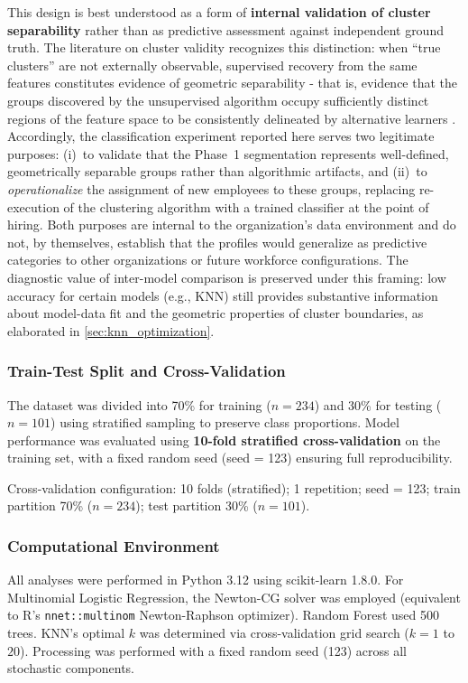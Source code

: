 \documentclass[alpha-refs,english]{RBCA_v3.0}
\begin{document}
This design is best understood as a form of \textbf{internal validation of cluster separability} rather than as predictive assessment against independent ground truth. The literature on cluster validity recognizes this distinction: when ``true clusters'' are not externally observable, supervised recovery from the same features constitutes evidence of geometric separability - that is, evidence that the groups discovered by the unsupervised algorithm occupy sufficiently distinct regions of the feature space to be consistently delineated by alternative learners \citep{Hennig2015}. Accordingly, the classification experiment reported here serves two legitimate purposes: (i)~to validate that the Phase~1 segmentation represents well-defined, geometrically separable groups rather than algorithmic artifacts, and (ii)~to \emph{operationalize} the assignment of new employees to these groups, replacing re-execution of the clustering algorithm with a trained classifier at the point of hiring. Both purposes are internal to the organization's data environment and do not, by themselves, establish that the profiles would generalize as predictive categories to other organizations or future workforce configurations. The diagnostic value of inter-model comparison is preserved under this framing: low accuracy for certain models (e.g., KNN) still provides substantive information about model-data fit and the geometric properties of cluster boundaries, as elaborated in \cref{sec:knn_optimization}.

\subsubsection{Train-Test Split and Cross-Validation}
The dataset was divided into 70\% for training ($n=234$) and 30\% for testing ($n=101$) using stratified sampling to preserve class proportions. Model performance was evaluated using \textbf{10-fold stratified cross-validation} on the training set, with a fixed random seed (seed = 123) ensuring full reproducibility.

Cross-validation configuration: 10 folds (stratified); 1 repetition; seed = 123; train partition 70\% ($n=234$); test partition 30\% ($n=101$).

\subsubsection{Computational Environment}
All analyses were performed in Python 3.12 using scikit-learn 1.8.0. For Multinomial Logistic Regression, the Newton-CG solver was employed (equivalent to R's \texttt{nnet::multinom} Newton-Raphson optimizer). Random Forest used 500 trees. KNN's optimal $k$ was determined via cross-validation grid search ($k=1$ to $20$). Processing was performed with a fixed random seed (123) across all stochastic components.
\end{document}
